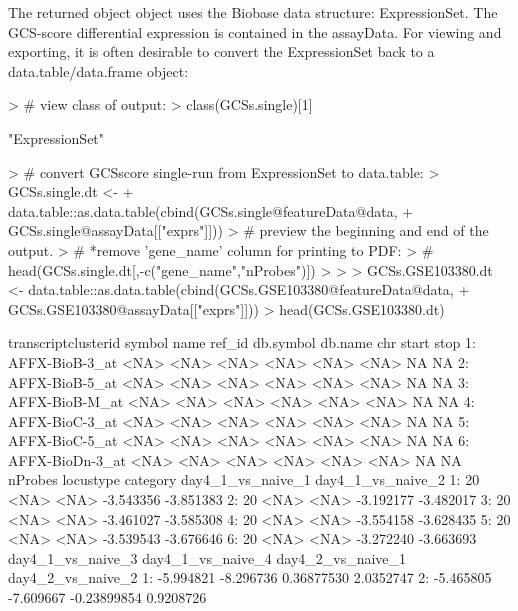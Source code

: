 \documentclass[12pt]{article}
\begin{document}
The returned object object uses the Biobase data structure: ExpressionSet.  The GCS-score differential expression is contained in the assayData.  For viewing and exporting, it is often desirable to convert the ExpressionSet back to a data.table/data.frame object: 

\begin{Schunk}
\begin{Sinput}
> # view class of output:
> class(GCSs.single)[1]
\end{Sinput}
\begin{Soutput}
[1] "ExpressionSet"
\end{Soutput}
\begin{Sinput}
> # convert GCSscore single-run from ExpressionSet to data.table:
> GCSs.single.dt <- 
+   data.table::as.data.table(cbind(GCSs.single@featureData@data,
+                                   GCSs.single@assayData[["exprs"]]))
> # preview the beginning and end of the output.
> # *remove 'gene_name' column for printing to PDF:
> # head(GCSs.single.dt[,-c("gene_name","nProbes")])
> 
> 
> GCSs.GSE103380.dt <- data.table::as.data.table(cbind(GCSs.GSE103380@featureData@data,
+                                                      GCSs.GSE103380@assayData[["exprs"]]))
> head(GCSs.GSE103380.dt)
\end{Sinput}
\begin{Soutput}
   transcriptclusterid symbol name ref_id db.symbol db.name  chr start stop
1:      AFFX-BioB-3_at   <NA> <NA>   <NA>      <NA>    <NA> <NA>    NA   NA
2:      AFFX-BioB-5_at   <NA> <NA>   <NA>      <NA>    <NA> <NA>    NA   NA
3:      AFFX-BioB-M_at   <NA> <NA>   <NA>      <NA>    <NA> <NA>    NA   NA
4:      AFFX-BioC-3_at   <NA> <NA>   <NA>      <NA>    <NA> <NA>    NA   NA
5:      AFFX-BioC-5_at   <NA> <NA>   <NA>      <NA>    <NA> <NA>    NA   NA
6:     AFFX-BioDn-3_at   <NA> <NA>   <NA>      <NA>    <NA> <NA>    NA   NA
   nProbes locustype category day4_1_vs_naive_1 day4_1_vs_naive_2
1:      20      <NA>     <NA>         -3.543356         -3.851383
2:      20      <NA>     <NA>         -3.192177         -3.482017
3:      20      <NA>     <NA>         -3.461027         -3.585308
4:      20      <NA>     <NA>         -3.554158         -3.628435
5:      20      <NA>     <NA>         -3.539543         -3.676646
6:      20      <NA>     <NA>         -3.272240         -3.663693
   day4_1_vs_naive_3 day4_1_vs_naive_4 day4_2_vs_naive_1 day4_2_vs_naive_2
1:         -5.994821         -8.296736        0.36877530         2.0352747
2:         -5.465805         -7.609667       -0.23899854         0.9208726

\end{Soutput}
\end{Schunk}
\end{document}
